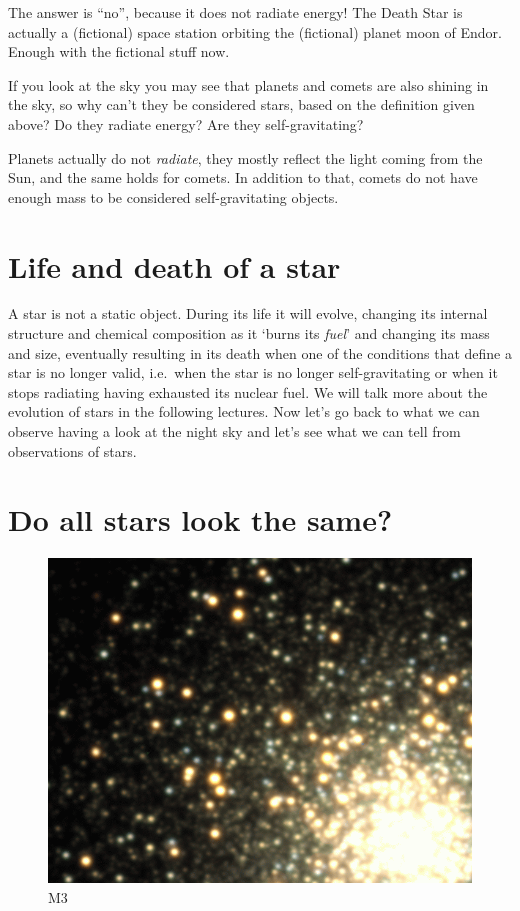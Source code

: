 \documentclass[
  letterpaper,
  DIV=11,
  numbers=noendperiod]{scrreprt}
\begin{document}
The answer is ``no'', because it does not radiate energy! The Death Star
is actually a (fictional) space station orbiting the (fictional) planet
moon of Endor. Enough with the fictional stuff now.

If you look at the sky you may see that planets and comets are also
shining in the sky, so why can't they be considered stars, based on the
definition given above? Do they radiate energy? Are they
self-gravitating?

Planets actually do not \emph{radiate}, they mostly reflect the light
coming from the Sun, and the same holds for comets. In addition to that,
comets do not have enough mass to be considered self-gravitating
objects.

\hypertarget{life-and-death-of-a-star}{%
\section{Life and death of a star}\label{life-and-death-of-a-star}}

A star is not a static object. During its life it will evolve, changing
its internal structure and chemical composition as it `burns its
\emph{fuel}' and changing its mass and size, eventually resulting in its
death when one of the conditions that define a star is no longer valid,
i.e.~when the star is no longer self-gravitating or when it stops
radiating having exhausted its nuclear fuel. We will talk more about the
evolution of stars in the following lectures. Now let's go back to what
we can observe having a look at the night sky and let's see what we can
tell from observations of stars.

\hypertarget{do-all-stars-look-the-same}{%
\section{Do all stars look the same?}\label{do-all-stars-look-the-same}}

\begin{figure}

{\centering \includegraphics{img/M3_color3.gif}

}

\caption{M3}

\end{figure}
\end{document}
